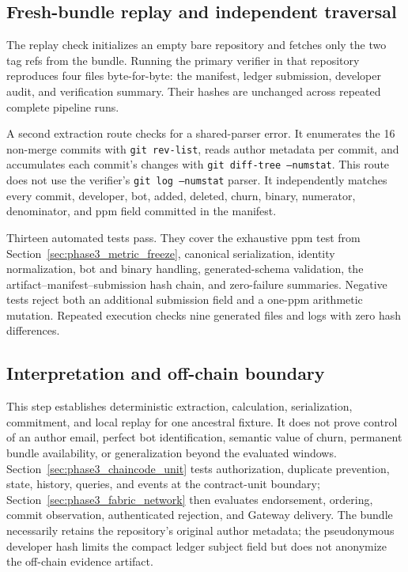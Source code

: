 \subsection{Fresh-bundle replay and independent traversal}
\label{sec:phase3_offchain_replay}

The replay check initializes an empty bare repository and fetches only the two tag refs from the bundle. Running the primary
verifier in that repository reproduces four files byte-for-byte: the manifest, ledger submission, developer audit, and
verification summary. Their hashes are unchanged across repeated complete pipeline runs.

A second extraction route checks for a shared-parser error. It enumerates the 16 non-merge commits with \texttt{git rev-list},
reads author metadata per commit, and accumulates each commit's changes with \texttt{git diff-tree --numstat}. This route does
not use the verifier's \texttt{git log --numstat} parser. It independently matches every commit, developer, bot, added,
deleted, churn, binary, numerator, denominator, and ppm field committed in the manifest.

Thirteen automated tests pass. They cover the exhaustive ppm test from Section~\ref{sec:phase3_metric_freeze}, canonical
serialization, identity normalization, bot and binary handling, generated-schema validation, the artifact--manifest--submission
hash chain, and zero-failure summaries. Negative tests reject both an additional submission field and a one-ppm arithmetic
mutation. Repeated execution checks nine generated files and logs with zero hash differences.

\subsection{Interpretation and off-chain boundary}
\label{sec:phase3_offchain_boundary_result}

This step establishes deterministic extraction, calculation, serialization, commitment, and local replay for one ancestral
fixture. It does not prove control of an author email, perfect bot identification, semantic value of churn, permanent bundle
availability, or generalization beyond the evaluated windows. Section~\ref{sec:phase3_chaincode_unit} tests authorization,
duplicate prevention, state, history, queries, and events at the contract-unit boundary; Section~\ref{sec:phase3_fabric_network}
then evaluates endorsement, ordering, commit observation, authenticated rejection, and Gateway delivery. The bundle necessarily retains the repository's original author
metadata; the pseudonymous developer hash limits the compact ledger subject field but does not anonymize the off-chain evidence
artifact.
